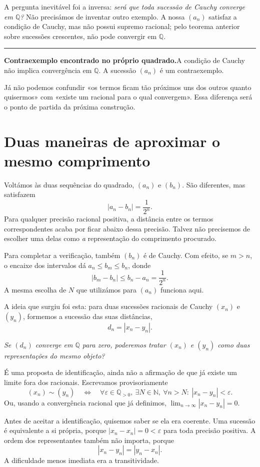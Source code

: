 \documentclass[11pt,a4paper]{article}
\newcommand{\Q}{\mathbb{Q}}
\newcommand{\N}{\mathbb{N}}
\newcommand{\questao}[1]{\par\medskip\noindent\textit{#1}\par\smallskip}
\newcommand{\assentado}[2]{%
\par\medskip\noindent\begingroup\color{azul}\rule{\linewidth}{0.45pt}\par\smallskip
\noindent\textbf{#1.}\enspace #2\par\endgroup\medskip}
\begin{document}
A pergunta inevitável foi a inversa: \emph{será que toda sucessão de Cauchy converge em $\Q$?} Não precisámos de inventar outro exemplo. A nossa $(a_n)$ satisfaz a condição de Cauchy, mas não possui supremo racional; pelo teorema anterior sobre sucessões crescentes, não pode convergir em $\Q$.

\assentado{Contraexemplo encontrado no próprio quadrado}{A condição de Cauchy não implica convergência em $\Q$. A sucessão $(a_n)$ é um contraexemplo.}

Já não podemos confundir «os termos ficam tão próximos uns dos outros quanto quisermos» com «existe um racional para o qual convergem». Essa diferença será o ponto de partida da próxima construção.

\section{Duas maneiras de aproximar o mesmo comprimento}

Voltámos às duas sequências do quadrado, $(a_n)$ e $(b_n)$. São diferentes, mas satisfazem
\[
 |a_n-b_n|=\frac1{2^n}.
\]
Para qualquer precisão racional positiva, a distância entre os termos correspondentes acaba por ficar abaixo dessa precisão. Talvez não precisemos de escolher uma delas como \emph{a} representação do comprimento procurado.

Para completar a verificação, também $(b_n)$ é de Cauchy. Com efeito, se $m>n$, o encaixe dos intervalos dá $a_n\le b_m\le b_n$, donde
\[
 |b_m-b_n|\le b_n-a_n=\frac1{2^n}.
\]
A mesma escolha de $N$ que utilizámos para $(a_n)$ funciona aqui.

A ideia que surgiu foi esta: para duas sucessões racionais de Cauchy $(x_n)$ e $(y_n)$, formemos a sucessão das suas distâncias,
\[
 d_n=|x_n-y_n|.
\]
\questao{Se $(d_n)$ converge em $\Q$ para zero, poderemos tratar $(x_n)$ e $(y_n)$ como duas representações do mesmo objeto?}

É uma proposta de identificação, ainda não a afirmação de que já existe um limite fora dos racionais. Escrevamos provisoriamente
\[
 (x_n)\sim(y_n)
 \quad\Longleftrightarrow\quad
 \forall\varepsilon\in\Q_{>0},\ \exists N\in\N,\
 \forall n>N:\ |x_n-y_n|<\varepsilon.
\]
Ou, usando a convergência racional que já definimos, $\lim_{n\to\infty}|x_n-y_n|=0$.

Antes de aceitar a identificação, quisemos saber se ela era coerente. Uma sucessão é equivalente a si própria, porque $|x_n-x_n|=0<\varepsilon$ para toda precisão positiva. A ordem dos representantes também não importa, porque
\[
 |x_n-y_n|=|y_n-x_n|.
\]
A dificuldade menos imediata era a transitividade.
\end{document}

